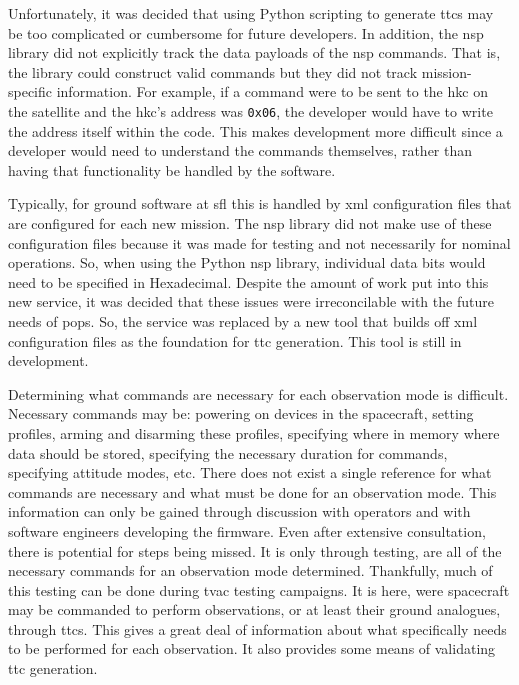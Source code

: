 Unfortunately, it was decided that using Python scripting to generate
\glspl{ttc} may be too complicated or cumbersome for future developers. In
addition, the \gls{nsp} library did not explicitly track the data payloads of
the \gls{nsp} commands. That is, the library could construct valid commands but
they did not track mission-specific information. For example, if a command were
to be sent to the \gls{hkc} on the satellite and the \gls{hkc}'s address was
\texttt{0x06}, the developer would have to write the address itself within the
code. This makes development more difficult since a developer would need to
understand the commands themselves, rather than having that functionality be
handled by the software. 

Typically, for ground software at \gls{sfl} this is handled by \gls{xml}
configuration files that are configured for each new mission.  The \gls{nsp}
library did not make use of these configuration files because it was made for
testing and not necessarily for nominal operations. So, when using the Python
\gls{nsp} library, individual data bits would need to be specified in
Hexadecimal.  Despite the amount of work put into this new service, it was
decided that these issues were irreconcilable with the future needs of
\gls{pops}. So, the service was replaced by a new tool that builds off
\gls{xml} configuration files as the foundation for \gls{ttc} generation.  This
tool is still in development.

Determining what commands are necessary for each observation mode is difficult.
Necessary commands may be: powering on devices in the spacecraft, setting
profiles, arming and disarming these profiles, specifying where in memory where
data should be stored, specifying the necessary duration for commands,
specifying attitude modes, etc.  There does not exist a single reference for
what commands are necessary and what must be done for an observation mode. This
information can only be gained through discussion with operators and with
software engineers developing the firmware.  Even after extensive consultation,
there is potential for steps being missed. It is only through testing, are all
of the necessary commands for an observation mode determined.  Thankfully, much
of this testing can be done during \gls{tvac} testing campaigns. It is here,
were spacecraft may be commanded to perform observations, or at least their
ground analogues, through \glspl{ttc}.  This gives a great deal of information
about what specifically needs to be performed for each observation. It also
provides some means of validating \gls{ttc} generation.


